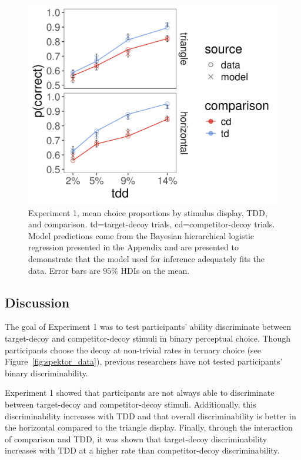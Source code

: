 \begin{figure}
   \includegraphics[width=\textwidth]{figures/m14_model_preds_v_data.jpeg}
   \caption{Experiment 1, mean choice proportions by stimulus display, TDD, and comparison. td=target-decoy trials, cd=competitor-decoy trials. Model predictions come from the Bayesian hierarchical logistic regression presented in the Appendix and are presented to demonstrate that the model used for inference adequately fits the data. Error bars are $95\%$ HDIs on the mean.}
   \label{fig:e1_data}
\end{figure}

\subsection{Discussion}

The goal of Experiment 1 was to test participants' ability discriminate between target-decoy and competitor-decoy stimuli in binary perceptual choice. Though participants choose the decoy at non-trivial rates in ternary choice (see Figure~\ref{fig:spektor_data}), previous researchers have not tested participants' binary discriminability. 

Experiment 1 showed that participants are not always able to discriminate between target-decoy and competitor-decoy stimuli. Additionally, this discriminability increases with TDD and that overall discriminability is better in the horizontal compared to the triangle display. Finally, through the interaction of comparison and TDD, it was shown that target-decoy discriminability increases with TDD at a higher rate than competitor-decoy discriminability. 

